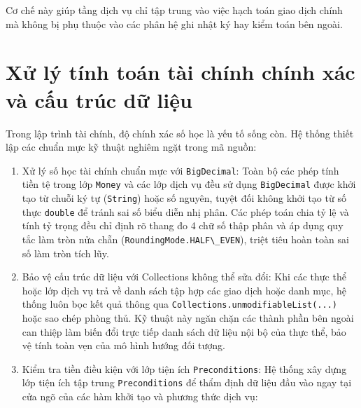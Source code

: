 \documentclass[a4paper,12pt]{report}
\newcommand{\passthrough}[1]{#1}
\begin{document}
Cơ chế này giúp tầng dịch vụ chỉ tập trung vào việc hạch toán giao dịch
chính mà không bị phụ thuộc vào các phân hệ ghi nhật ký hay kiểm toán
bên ngoài.

\section{Xử lý tính toán tài chính chính xác và cấu trúc dữ
liệu}\label{xux1eed-luxfd-tuxednh-touxe1n-tuxe0i-chuxednh-chuxednh-xuxe1c-vuxe0-cux1ea5u-truxfac-dux1eef-liux1ec7u}

Trong lập trình tài chính, độ chính xác số học là yếu tố sống còn. Hệ
thống thiết lập các chuẩn mực kỹ thuật nghiêm ngặt trong mã nguồn:

\begin{enumerate}
\def\labelenumi{\arabic{enumi}.}
\item
  Xử lý số học tài chính chuẩn mực với
  \passthrough{\lstinline!BigDecimal!}: Toàn bộ các phép tính tiền tệ
  trong lớp \passthrough{\lstinline!Money!} và các lớp dịch vụ đều sử
  dụng \passthrough{\lstinline!BigDecimal!} được khởi tạo từ chuỗi ký tự
  (\passthrough{\lstinline!String!}) hoặc số nguyên, tuyệt đối không
  khởi tạo từ số thực \passthrough{\lstinline!double!} để tránh sai số
  biểu diễn nhị phân. Các phép toán chia tỷ lệ và tính tỷ trọng đều chỉ
  định rõ thang đo 4 chữ số thập phân và áp dụng quy tắc làm tròn nửa
  chẵn (\passthrough{\lstinline!RoundingMode.HALF\_EVEN!}), triệt tiêu
  hoàn toàn sai số làm tròn tích lũy.
\item
  Bảo vệ cấu trúc dữ liệu với Collections không thể sửa đổi: Khi các
  thực thể hoặc lớp dịch vụ trả về danh sách tập hợp các giao dịch hoặc
  danh mục, hệ thống luôn bọc kết quả thông qua
  \passthrough{\lstinline!Collections.unmodifiableList(...)!} hoặc sao
  chép phòng thủ. Kỹ thuật này ngăn chặn các thành phần bên ngoài can
  thiệp làm biến đổi trực tiếp danh sách dữ liệu nội bộ của thực thể,
  bảo vệ tính toàn vẹn của mô hình hướng đối tượng.
\item
  Kiểm tra tiền điều kiện với lớp tiện ích
  \passthrough{\lstinline!Preconditions!}: Hệ thống xây dựng lớp tiện
  ích tập trung \passthrough{\lstinline!Preconditions!} để thẩm định dữ
  liệu đầu vào ngay tại cửa ngõ của các hàm khởi tạo và phương thức dịch
  vụ:
\end{enumerate}
\end{document}
